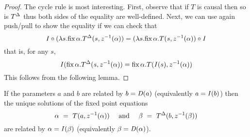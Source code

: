 \begin{proof}
The cycle rule is most interesting. First, observe that if $T$ is causal then so is
${T}^{\Delta}$ thus both sides of the
equality are well-defined. Next, we can use again push/pull to show the equality
if we can check that
$$
\mathit{I}\circ(\lambda s. \mbox{fix}\,\alpha.{T}^{\Delta}(s,z^{-1}(\alpha)) =
(\lambda s. \mbox{fix}\,\alpha.T(s,z^{-1}(\alpha))\circ\mathit{I}
$$
that is, for any $s$,
$$
\mathit{I}(\mbox{fix}\,\alpha.{T}^{\Delta}(s,z^{-1}(\alpha)) =
\mbox{fix}\,\alpha.T(\mathit{I}(s),z^{-1}(\alpha))
$$
This follows from the following lemma.
\end{proof}

\begin{lemma}
\label{lemma-delta-fix}
If the parameters $a$ and $b$ are related by $b=\mathit{D}(a)$ (equivalently $a=\mathit{I}(b)$)
then the unique solutions of the fixed point equations
$$
\alpha~=~ T(a,z^{-1}(\alpha))~~~~\mbox{and}~~~~
\beta~=~{T}^{\Delta}(b,z^{-1}(\beta))
$$
are related by $\alpha=\mathit{I}(\beta)$ (equivalently $\beta=\mathit{D}(\alpha)$).
\end{lemma}
